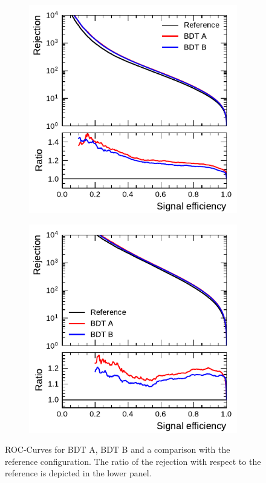 \begin{figure}[htb]
  \begin{subfigure}[t]{0.48\textwidth}
    \centering
    \includegraphics{./figures/bdt_perf/roc/bdt_1p_comparison.pdf}
    \label{fig:bdt_1p_roc}
  \end{subfigure}\hfill
  \begin{subfigure}[t]{0.48\textwidth}
    \centering
    \includegraphics{./figures/bdt_perf/roc/bdt_3p_comparison.pdf}
    \label{fig:bdt_3p_roc}
  \end{subfigure}
  \caption{ROC-Curves for BDT A, BDT B and a comparison with the reference
    configuration. The ratio of the rejection with respect to the reference is
    depicted in the lower panel.}
  \label{fig:bdt_rocs}
\end{figure}

